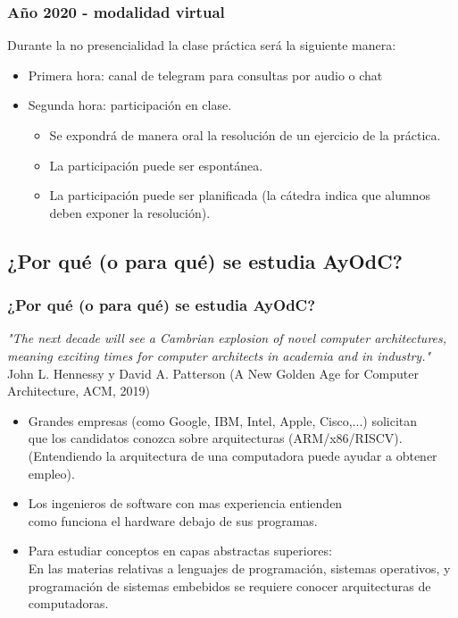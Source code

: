 \documentclass[aspectratio=169,compress]{beamer}
\begin{document}
\begin{frame}[fragile]
  \frametitle{Año 2020 - modalidad virtual}
  Durante la no presencialidad la clase práctica será la siguiente manera:

\bigskip
\begin{itemize}
\item Primera hora: canal de telegram para consultas por audio o chat
\bigskip
\item Segunda hora: participación en clase.
\begin{itemize}
\item Se expondrá de manera oral la resolución de un ejercicio de la práctica.
\item La participación puede ser espontánea.
\item La participación puede ser planificada (la cátedra indica que alumnos deben exponer la resolución).
\end{itemize}
\end{itemize}

\end{frame}

\subsection{¿Por qué (o para qué) se estudia AyOdC?}

\begin{frame}[fragile]
  \frametitle{¿Por qué (o para qué) se estudia AyOdC?}
\begin{small}
\textit{"The next decade will see a Cambrian explosion of novel computer architectures, meaning exciting times for computer architects in academia and in industry."}
John L. Hennessy y David A. Patterson 
(A New Golden Age for Computer Architecture, ACM, 2019)
\end{small}

\bigskip
\begin{small}
\begin{itemize}
\item Grandes empresas (como Google, IBM, Intel, Apple, Cisco,...)
solicitan \\ que los candidatos conozca sobre arquitecturas (ARM/x86/RISCV).\\
(Entendiendo la arquitectura de una computadora puede ayudar a obtener empleo).

\item Los ingenieros de software con mas experiencia entienden \\ como funciona el hardware debajo de sus programas.

\item Para estudiar conceptos en capas abstractas superiores: \\
En las materias relativas a lenguajes de programación, sistemas operativos, y programación de sistemas embebidos se requiere conocer arquitecturas de computadoras.

\end{itemize}
\end{small}

\end{frame}
\end{document}
